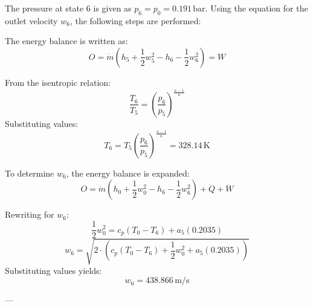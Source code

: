 The pressure at state 6 is given as \( p_6 = p_0 = 0.191 \, \text{bar} \). Using the equation for the outlet velocity \( w_6 \), the following steps are performed:  

The energy balance is written as:  
\[
O = \dot{m} \left( h_5 + \frac{1}{2} w_5^2 - h_6 - \frac{1}{2} w_6^2 \right) = W
\]  

From the isentropic relation:  
\[
\frac{T_6}{T_5} = \left( \frac{p_6}{p_5} \right)^{\frac{\kappa - 1}{\kappa}}
\]  
Substituting values:  
\[
T_6 = T_5 \left( \frac{p_6}{p_5} \right)^{\frac{\kappa - 1}{\kappa}} = 328.14 \, \text{K}
\]  

To determine \( w_6 \), the energy balance is expanded:  
\[
O = \dot{m} \left( h_0 + \frac{1}{2} w_0^2 - h_6 - \frac{1}{2} w_6^2 \right) + \dot{Q} + \dot{W}
\]  

Rewriting for \( w_6 \):  
\[
\frac{1}{2} w_0^2 = c_p \left( T_0 - T_6 \right) + a_5 (0.2035)
\]  
\[
w_6 = \sqrt{2 \cdot \left( c_p \left( T_0 - T_6 \right) + \frac{1}{2} w_0^2 + a_5 (0.2035) \right)}
\]  
Substituting values yields:  
\[
w_6 = 438.866 \, \text{m/s}
\]  

---